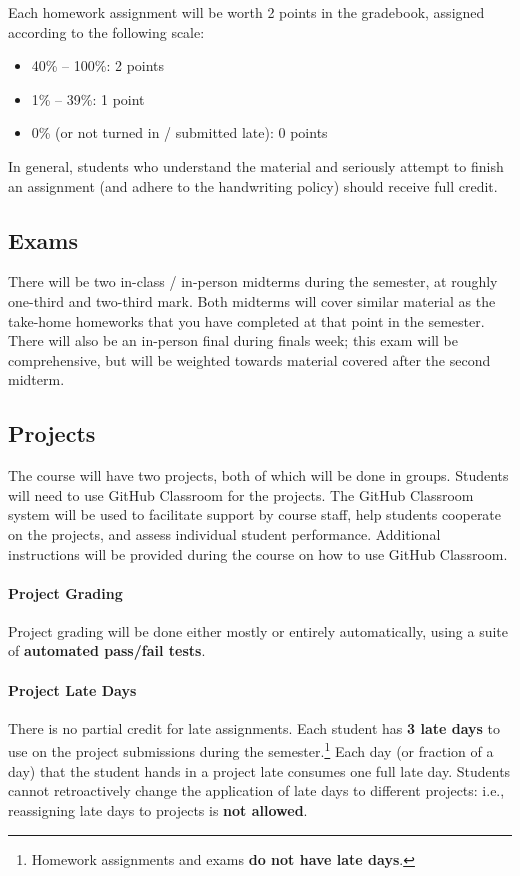 \documentclass[letterpaper,11pt]{article}
\begin{document}
Each homework assignment will be worth 2 points in the gradebook,
assigned according to the following scale:
\begin{itemize}
\item 40\% -- 100\%: 2 points
\item 1\% -- 39\%: 1 point
\item 0\% (or not turned in / submitted late): 0 points
\end{itemize}
In general, students who understand the material and seriously attempt
to finish an assignment (and adhere to the handwriting policy) should
receive full credit.

\subsection*{Exams}
There will be two in-class / in-person midterms during the semester,
at roughly one-third and two-third mark. Both midterms will cover
similar material as the take-home homeworks that you have completed at
that point in the semester. There will also be an in-person final
during finals week; this exam will be comprehensive, but will be
weighted towards material covered after the second midterm.

\subsection*{Projects}

The course will have two projects, both of which will be done in
groups. Students will need to use GitHub Classroom for the projects.
The GitHub Classroom system will be used to facilitate support by
course staff, help students cooperate on the projects, and assess
individual student performance. Additional instructions will be
provided during the course on how to use GitHub Classroom.

\paragraph{Project Grading}
Project grading will be done either mostly or entirely automatically,
using a suite of \textbf{automated pass/fail tests}.

\paragraph{Project Late Days}
There is no partial credit for late assignments. Each student has
\textbf{3 late days} to use on the project submissions during the
semester.\footnote{Homework assignments and exams \textbf{do not have
    late days}.} Each day (or fraction of a day) that the student
hands in a project late consumes one full late day. Students cannot
retroactively change the application of late days to different
projects: i.e., reassigning late days to projects is \textbf{not
  allowed}.
\end{document}
